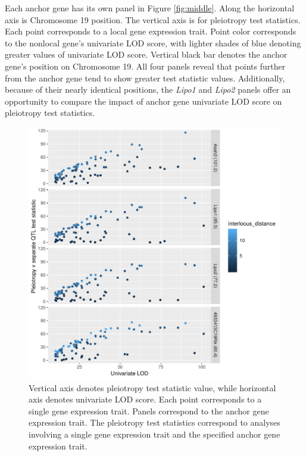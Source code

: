 \documentclass{article}
\begin{document}
Each anchor gene has its own panel in Figure \ref{fig:middle}. Along the horizontal axis is Chromosome 19 position. The vertical axis is for pleiotropy test statistics. Each point corresponds to a local gene expression trait. Point color corresponds to the nonlocal gene's univariate LOD score, with lighter shades of blue denoting greater values of univariate LOD score. Vertical black bar denotes the anchor gene's position on Chromosome 19. All four panels reveal that points further from the anchor gene tend to show greater test statistic values. Additionally, because of their nearly identical positions, the \emph{Lipo1} and \emph{Lipo2} panels offer an opportunity to compare the impact of anchor gene univariate LOD score on pleiotropy test statistics.





\begin{figure}
    \centering
    \includegraphics[width = \textwidth]{../Rmd/lrt-v-univariate-lod.pdf}
    \caption[Pleiotropy LRT vs. univariate LOD score plots reveal that greater univariate LOD scores (and greater interlocus distance) tend to correspond to greater pleiotropy LRT values.]{Vertical axis denotes pleiotropy test statistic value, while horizontal axis denotes univariate LOD score. Each point corresponds to a single gene expression trait. Panels correspond to the anchor gene expression trait. The pleiotropy test statistics correspond to analyses involving a single gene expression trait and the specified anchor gene expression trait.}
    \label{fig:lod}
\end{figure}
\end{document}
